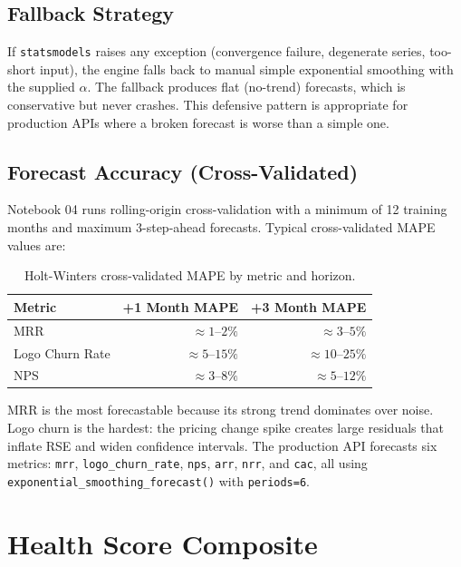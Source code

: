\subsection{Fallback Strategy}

If \texttt{statsmodels} raises any exception (convergence failure, degenerate series, too-short input), the engine falls back to manual simple exponential smoothing with the supplied $\alpha$. The fallback produces flat (no-trend) forecasts, which is conservative but never crashes. This defensive pattern is appropriate for production APIs where a broken forecast is worse than a simple one.

\subsection{Forecast Accuracy (Cross-Validated)}

Notebook 04 runs rolling-origin cross-validation with a minimum of 12 training months and maximum 3-step-ahead forecasts. Typical cross-validated MAPE values are:

\begin{table}[h]
\centering
\caption{Holt-Winters cross-validated MAPE by metric and horizon.}
\begin{tabular}{lrr}
\toprule
\textbf{Metric} & \textbf{+1 Month MAPE} & \textbf{+3 Month MAPE} \\
\midrule
MRR            & $\approx 1$--$2\%$ & $\approx 3$--$5\%$ \\
Logo Churn Rate & $\approx 5$--$15\%$ & $\approx 10$--$25\%$ \\
NPS            & $\approx 3$--$8\%$ & $\approx 5$--$12\%$ \\
\bottomrule
\end{tabular}
\label{tab:forecast-accuracy}
\end{table}

MRR is the most forecastable because its strong trend dominates over noise. Logo churn is the hardest: the pricing change spike creates large residuals that inflate RSE and widen confidence intervals. The production API forecasts six metrics: \texttt{mrr}, \texttt{logo\_churn\_rate}, \texttt{nps}, \texttt{arr}, \texttt{nrr}, and \texttt{cac}, all using \texttt{exponential\_smoothing\_forecast()} with \texttt{periods=6}.

\section{Health Score Composite}
\label{sec:kpi-health}

